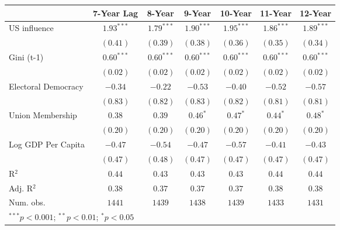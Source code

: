 
\begin{table}
\begin{center}
\begin{tabular}{l c c c c c c}
\toprule
 & 7-Year Lag & 8-Year & 9-Year & 10-Year & 11-Year & 12-Year \\
\midrule
US influence        & $\mathbf{1.93}^{***}$ & $\mathbf{1.79}^{***}$ & $\mathbf{1.90}^{***}$ & $\mathbf{1.95}^{***}$ & $\mathbf{1.86}^{***}$ & $\mathbf{1.89}^{***}$ \\
                    & $(0.41)$              & $(0.39)$              & $(0.38)$              & $(0.36)$              & $(0.35)$              & $(0.34)$              \\
Gini (t-1)          & $\mathbf{0.60}^{***}$ & $\mathbf{0.60}^{***}$ & $\mathbf{0.60}^{***}$ & $\mathbf{0.60}^{***}$ & $\mathbf{0.60}^{***}$ & $\mathbf{0.60}^{***}$ \\
                    & $(0.02)$              & $(0.02)$              & $(0.02)$              & $(0.02)$              & $(0.02)$              & $(0.02)$              \\
Electoral Democracy & $-0.34$               & $-0.22$               & $-0.53$               & $-0.40$               & $-0.52$               & $-0.57$               \\
                    & $(0.83)$              & $(0.82)$              & $(0.83)$              & $(0.82)$              & $(0.81)$              & $(0.81)$              \\
Union Membership    & $0.38$                & $0.39$                & $\mathbf{0.46}^{*}$   & $\mathbf{0.47}^{*}$   & $\mathbf{0.44}^{*}$   & $\mathbf{0.48}^{*}$   \\
                    & $(0.20)$              & $(0.20)$              & $(0.20)$              & $(0.20)$              & $(0.20)$              & $(0.20)$              \\
Log GDP Per Capita  & $-0.47$               & $-0.54$               & $-0.47$               & $-0.57$               & $-0.41$               & $-0.43$               \\
                    & $(0.47)$              & $(0.48)$              & $(0.47)$              & $(0.47)$              & $(0.47)$              & $(0.47)$              \\
\midrule
R$^2$               & $0.44$                & $0.43$                & $0.43$                & $0.43$                & $0.44$                & $0.44$                \\
Adj. R$^2$          & $0.38$                & $0.37$                & $0.37$                & $0.37$                & $0.38$                & $0.38$                \\
Num. obs.           & $1441$                & $1439$                & $1438$                & $1439$                & $1433$                & $1431$                \\
\bottomrule
\multicolumn{7}{l}{\scriptsize{$^{***}p<0.001$; $^{**}p<0.01$; $^{*}p<0.05$}}
\end{tabular}
\label{table:coefficients}
\end{center}
\end{table}
